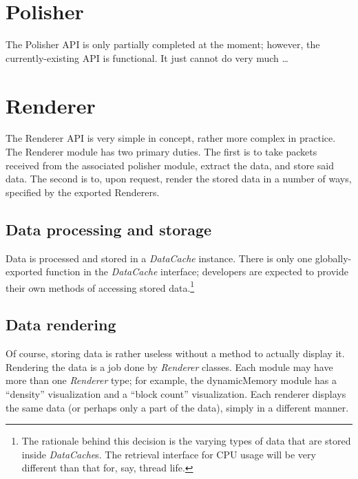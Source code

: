 \section{Polisher}
The Polisher API is only partially completed at the moment; however, the currently-existing API is functional. It just
cannot do very much \ldots

\section{Renderer}
The Renderer API is very simple in concept, rather more complex in practice. The Renderer module has two primary
duties. The first is to take packets received from the associated polisher module, extract the data, and store said
data. The second is to, upon request, render the stored data in a number of ways, specified by the exported Renderers.

\subsection{Data processing and storage}
Data is processed and stored in a \emph{DataCache} instance. There is only one globally-exported function in the
\emph{DataCache} interface; developers are expected to provide their own methods of accessing stored data.\footnote{The
rationale behind this decision is the varying types of data that are stored inside \emph{DataCache}s. The retrieval
interface for CPU usage will be very different than that for, say, thread life.}


\subsection{Data rendering}
Of course, storing data is rather useless without a method to actually display it. Rendering the data is a job done by
\emph{Renderer} classes. Each module may have more than one \emph{Renderer} type; for example, the dynamicMemory module
has a ``density'' visualization and a ``block count'' visualization. Each renderer displays the same data (or perhaps
only a part of the data), simply in a different manner.

